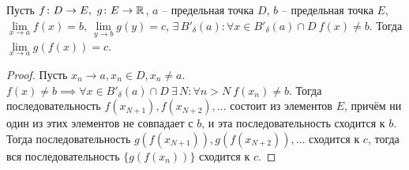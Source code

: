 \documentclass[12pt]{article}
\begin{document}
\begin{theorem}
	Пусть $f\colon D\to E,\ g\colon E\to\mathbb{R}$, $a$ -- предельная точка
	$D$, $b$ -- предельная точка $E$, $\lim\limits_{x\to
	a}f(x)=b,\ \lim\limits_{y\to b}g(y)=c$, $\exists\,B'_\delta(a)\colon
	\forall x\in B'_\delta(a)\cap D\ f(x)\neq b$. Тогда
	$\lim\limits_{x\to a}g(f(x))=c$.
	\begin{proof}
		Пусть $x_n\to a, x_n\in D, x_n\neq a$. $f(x)\neq b\implies \forall
		x\in B'_\delta(a)\cap D\ \exists\,N\colon\forall n>N\  f(x_n)\neq
		b$. Тогда последовательность $f(x_{N+1}), f(x_{N+2}),\ldots$
		состоит из элементов $E$, причём ни один из этих элементов не
		совпадает с $b$, и эта последовательность сходится к $b$. Тогда
		последовательность $g(f(x_{N+1})), g(f(x_{N+2})),\ldots$ сходится к
		$c$, тогда вся последовательность $\{g(f(x_n))\}$ сходится к $c$.
	\end{proof}
\end{theorem}
\end{document}
